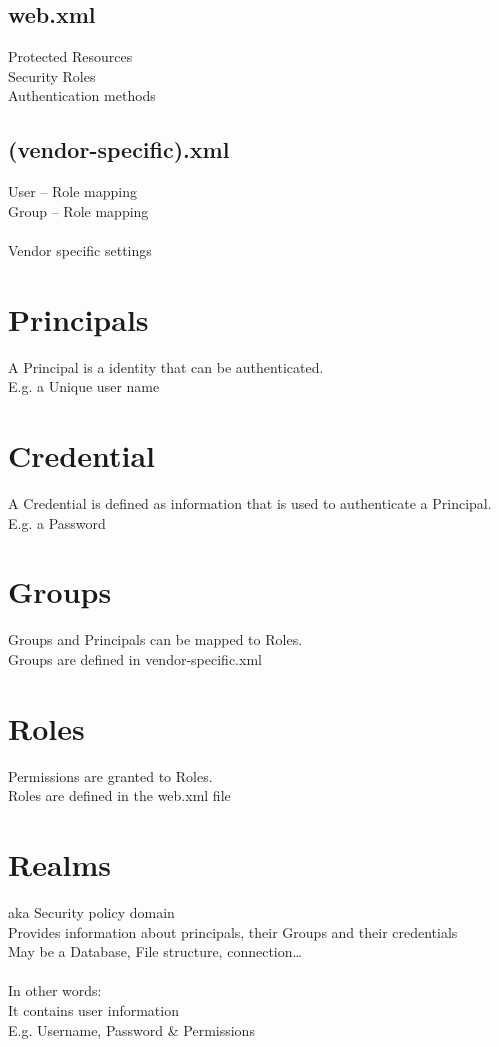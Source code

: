 \documentclass[12pt,a4paper]{report}
\begin{document}
\subsection*{web.xml}
Protected Resources\\
Security Roles\\
Authentication methods\\

\subsection*{(vendor-specific).xml}
User – Role mapping\\
Group – Role mapping\\
\\
Vendor specific settings\\

\section{Principals}
A Principal is a identity that can be authenticated.\\
E.g. a Unique user name\\

\section{Credential}
A Credential is defined as information that is used to authenticate a Principal.\\
E.g. a Password\\

\section{Groups}
Groups and Principals can be mapped to Roles.\\
Groups are defined in vendor-specific.xml\\

\section{Roles}
Permissions are granted to Roles.\\
Roles are defined in the web.xml file\\

\section{Realms}
aka Security policy domain\\
Provides information about principals, their Groups and their credentials\\
May be a Database, File structure, connection…\\\\
In other words:\\
It contains user information\\
E.g. Username, Password \& Permissions\\
\end{document}
